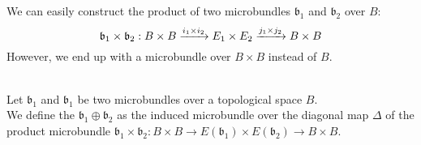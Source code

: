 We can easily construct the product of two microbundles $\mathfrak{b}_1$ and $\mathfrak{b}_2$ over $B$:
\[\mathfrak{b}_1 \times \mathfrak{b}_2: \bundle{B \times B}{E_1 \times E_2}{i_1 \times i_2}{j_1 \times j_2}\]
However, we end up with a microbundle over $B \times B$ instead of $B$.

\\ Let $\mathfrak{b}_1$ and $\mathfrak{b}_1$ be two microbundles over a topological space $B$.
\\ We define the  $\mathfrak{b}_1 \oplus \mathfrak{b}_2$ as the induced microbundle over the diagonal map $\Delta$
of the product microbundle $\mathfrak{b}_1 \times \mathfrak{b}_2: B \times B \to E(\mathfrak{b}_1) \times E(\mathfrak{b}_2) \to B \times B$.